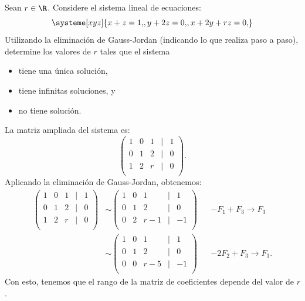 \documentclass[11pt,respuestas,a4]{aleph-examen}
\begin{document}
\begin{preguntas}
\item Sean $r \in \R$. Considere el sistema lineal de ecuaciones:
    \[
        \systeme[xyz]{x + z = 1{,}, 
        y + 2z = 0{,}, 
        x + 2y + rz = 0{,}}
    \]
    Utilizando la eliminación de Gauss-Jordan (indicando lo que realiza paso a paso), determine los valores de $r$ tales que el sistema
    \begin{itemize}
        \item tiene una única solución,
        \item tiene infinitas soluciones, y
        \item no tiene solución.
    \end{itemize}

\begin{respuesta}
La matriz ampliada del sistema es:
\[
    \begin{pmatrix}
        1 & 0 & 1 & | & 1 \\
        0 & 1 & 2 & | & 0 \\
        1 & 2 & r & | & 0 \\
    \end{pmatrix}.
\]
Aplicando la eliminación de Gauss-Jordan, obtenemos:
\begin{align*}
    \begin{pmatrix}
        1 & 0 & 1 & | & 1 \\
        0 & 1 & 2 & | & 0 \\
        1 & 2 & r & | & 0 \\
    \end{pmatrix} & \sim  \begin{pmatrix}
        1 & 0 & 1 & | & 1 \\
        0 & 1 & 2 & | & 0 \\
        0 & 2 & r-1 & | & -1 \\
    \end{pmatrix} && - F_1 + F_3 \rightarrow F_3 \\
    & \sim  \begin{pmatrix}
        1 & 0 & 1 & | & 1 \\
        0 & 1 & 2 & | & 0 \\
        0 & 0 & r-5 & | & -1 \\
    \end{pmatrix} && - 2F_2 + F_3 \rightarrow F_3.
\end{align*}
Con esto, tenemos que el rango de la matriz de coeficientes depende del valor de $r$.


\end{respuesta}
\end{preguntas}
\end{document}
